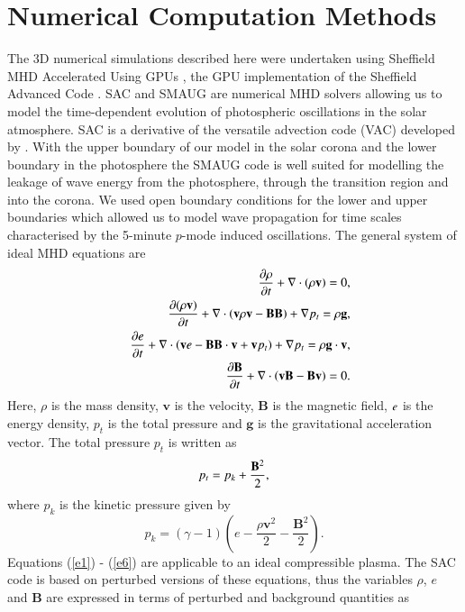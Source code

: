 \documentclass[preprint,authoryear,12pt]{elsarticle}
\begin{document}
\section{Numerical Computation Methods}

The 3D numerical simulations described here were undertaken using Sheffield MHD Accelerated Using GPUs \citep[SMAUG,][]{Griffiths2015}, the GPU implementation of the Sheffield Advanced Code \citep[SAC,][]{Shelyag2008}. SAC and SMAUG are numerical MHD solvers allowing us to model the time-dependent evolution of photospheric oscillations in the solar atmosphere. SAC is a derivative of the versatile advection code (VAC) developed by \citep{Toth1996}. With the upper boundary of our model in the solar corona and the lower boundary in the photosphere the SMAUG code is well suited for modelling the leakage of wave energy from the photosphere, through the transition region and into the corona. We used open boundary conditions for the lower and upper boundaries which allowed us to model wave propagation for time scales characterised by the 5-minute $p$-mode induced oscillations. The general system of ideal MHD equations are
\begin{eqnarray}
&& {{\partial \rho}\over{\partial t}}+\nabla\cdot\left( \rho{\mathbf v}\right)=0, \label{e1} \\
&& {{\partial ( \rho {\bf v})}\over{\partial t}}+\nabla\cdot\left( {\bf v}\rho {\bf v}-{\bf B B}\right)+\nabla p_t=\rho{\bf g}, \label{e2}\\
&& \frac{\partial e}{\partial t}+\nabla\cdot\left({\bf v}e-{\bf B B}\cdot{\bf v}+{\bf v}p_{t}\right)+\nabla p_t=\rho{\bf g}\cdot{\bf v}, \label{e3} \\
&& {{\partial{\bf B}}\over{\partial t}} +\nabla \cdot\left(  {\bf vB}-{\bf Bv}\right)=0. \label{e4}
\end{eqnarray}
Here, $\rho$ is the mass density, $\mathbf v$ is the velocity,  $\mathbf B$ is the magnetic field, $\it{e}$ is the energy density, $p_{t}$ is the total pressure and $\mathbf g$ is the gravitational acceleration vector.
The total pressure $p_{t}$ is written as
\begin{equation}
p_{t}=p_{k}+{{\bf B}^{2}\over{2}}, \label{e5}
\end{equation}
where $p_k$ is the kinetic pressure given by
\begin{equation}
p_{k}=\left(\gamma -1\right)\left(e-\frac{\rho {\mathbf v}^{2}}{2}-\frac{{\mathbf B}^{2}}{2}\right). \label{e6}
\end{equation}
Equations (\ref{e1}) - (\ref{e6}) are applicable to an ideal compressible plasma. The SAC code is based on perturbed versions of these equations, thus the variables $\rho $, $e$ and  $\mathbf B$ are expressed in terms of perturbed and background quantities as
\end{document}
